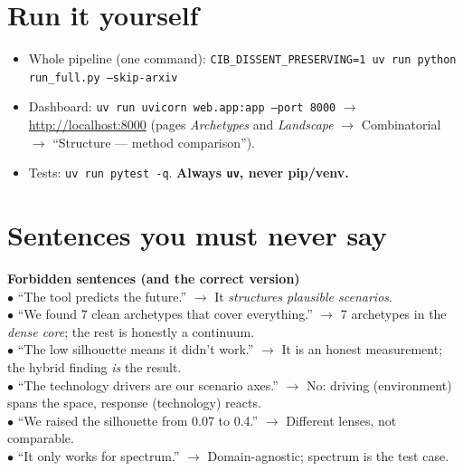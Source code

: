 \documentclass[11pt,a4paper]{article}
\newcommand{\callout}[3]{\par\smallskip\noindent
  \colorbox{#1}{\parbox{\dimexpr\linewidth-2\fboxsep\relax}{%
  \textbf{#2}\\[2pt]#3}}\par\smallskip}
\newcommand{\warnb}[2]{\callout{warnbg}{#1}{#2}}
\newcommand{\code}[1]{\texttt{\small #1}}
\begin{document}
\section{Run it yourself}
\begin{itemize}
  \item Whole pipeline (one command):
  \code{CIB\_DISSENT\_PRESERVING=1 uv run python run\_full.py --skip-arxiv}
  \item Dashboard: \code{uv run uvicorn web.app:app --port 8000} $\to$ \url{http://localhost:8000}
  (pages \emph{Archetypes} and \emph{Landscape} $\to$ Combinatorial $\to$ \enquote{Structure — method comparison}).
  \item Tests: \code{uv run pytest -q}. \textbf{Always \code{uv}, never pip/venv.}
\end{itemize}

\section*{Sentences you must never say}
\warnb{Forbidden sentences (and the correct version)}{%
$\bullet$ \enquote{The tool predicts the future.} $\to$ It \emph{structures plausible scenarios}.\\
$\bullet$ \enquote{We found 7 clean archetypes that cover everything.} $\to$ 7 archetypes in the
\emph{dense core}; the rest is honestly a continuum.\\
$\bullet$ \enquote{The low silhouette means it didn't work.} $\to$ It is an honest measurement; the hybrid
finding \emph{is} the result.\\
$\bullet$ \enquote{The technology drivers are our scenario axes.} $\to$ No: driving (environment) spans the
space, response (technology) reacts.\\
$\bullet$ \enquote{We raised the silhouette from 0.07 to 0.4.} $\to$ Different lenses, not comparable.\\
$\bullet$ \enquote{It only works for spectrum.} $\to$ Domain-agnostic; spectrum is the test case.}

\end{document}
